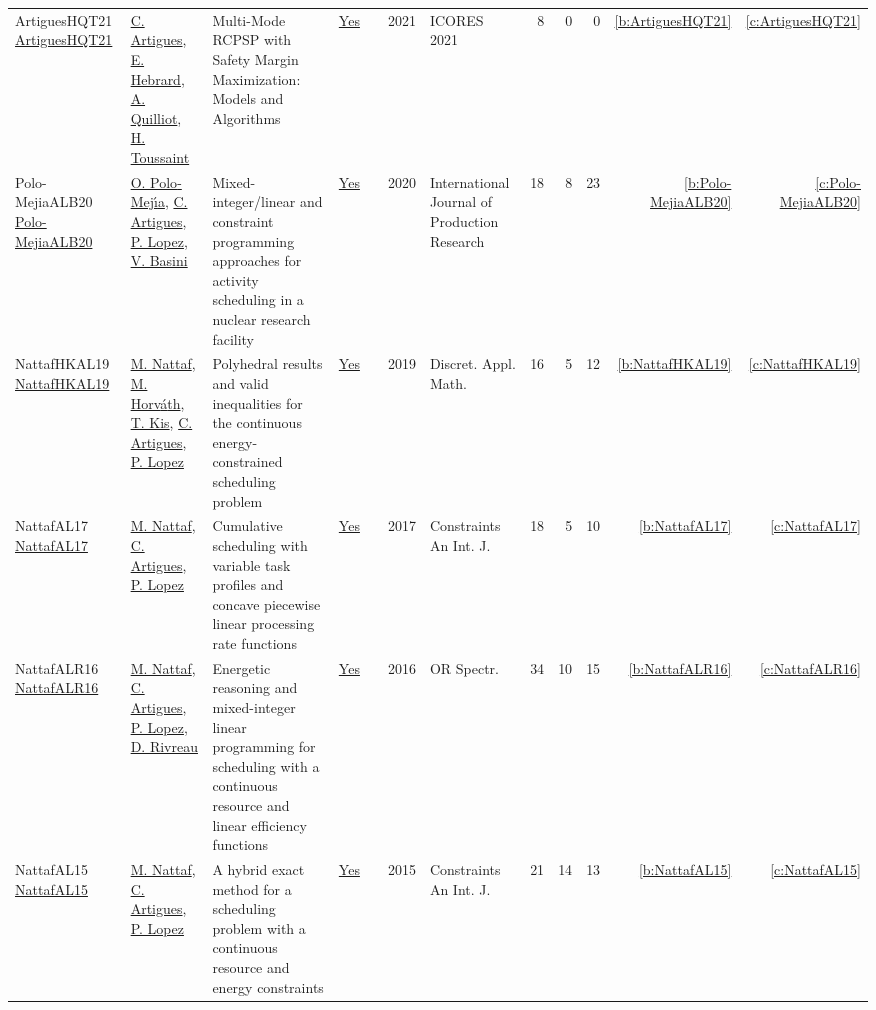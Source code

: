 {\begin{longtable}{>{\raggedright\arraybackslash}p{3cm}>{\raggedright\arraybackslash}p{6cm}>{\raggedright\arraybackslash}p{6.5cm}rrrp{2.5cm}rrrrr}
ArtiguesHQT21 \href{https://doi.org/10.5220/0010190101290136}{ArtiguesHQT21} & \hyperref[auth:a6]{C. Artigues}, \hyperref[auth:a1]{E. Hebrard}, \hyperref[auth:a801]{A. Quilliot}, \hyperref[auth:a802]{H. Toussaint} & Multi-Mode {RCPSP} with Safety Margin Maximization: Models and Algorithms & \href{works/ArtiguesHQT21.pdf}{Yes} & \cite{ArtiguesHQT21} & 2021 & ICORES 2021 & 8 & 0 & 0 & \ref{b:ArtiguesHQT21} & \ref{c:ArtiguesHQT21}\\
Polo-MejiaALB20 \href{https://doi.org/10.1080/00207543.2019.1693654}{Polo-MejiaALB20} & \hyperref[auth:a524]{O. Polo{-}Mej{\'{\i}}a}, \hyperref[auth:a6]{C. Artigues}, \hyperref[auth:a3]{P. Lopez}, \hyperref[auth:a525]{V. Basini} & Mixed-integer/linear and constraint programming approaches for activity scheduling in a nuclear research facility & \href{works/Polo-MejiaALB20.pdf}{Yes} & \cite{Polo-MejiaALB20} & 2020 & International Journal of Production Research & 18 & 8 & 23 & \ref{b:Polo-MejiaALB20} & \ref{c:Polo-MejiaALB20}\\
NattafHKAL19 \href{https://doi.org/10.1016/j.dam.2018.11.008}{NattafHKAL19} & \hyperref[auth:a81]{M. Nattaf}, \hyperref[auth:a1023]{M. Horv{\'{a}}th}, \hyperref[auth:a157]{T. Kis}, \hyperref[auth:a6]{C. Artigues}, \hyperref[auth:a3]{P. Lopez} & Polyhedral results and valid inequalities for the continuous energy-constrained scheduling problem & \href{works/NattafHKAL19.pdf}{Yes} & \cite{NattafHKAL19} & 2019 & Discret. Appl. Math. & 16 & 5 & 12 & \ref{b:NattafHKAL19} & \ref{c:NattafHKAL19}\\
NattafAL17 \href{https://doi.org/10.1007/s10601-017-9271-4}{NattafAL17} & \hyperref[auth:a81]{M. Nattaf}, \hyperref[auth:a6]{C. Artigues}, \hyperref[auth:a3]{P. Lopez} & Cumulative scheduling with variable task profiles and concave piecewise linear processing rate functions & \href{works/NattafAL17.pdf}{Yes} & \cite{NattafAL17} & 2017 & Constraints An Int. J. & 18 & 5 & 10 & \ref{b:NattafAL17} & \ref{c:NattafAL17}\\
NattafALR16 \href{https://doi.org/10.1007/s00291-015-0423-x}{NattafALR16} & \hyperref[auth:a81]{M. Nattaf}, \hyperref[auth:a6]{C. Artigues}, \hyperref[auth:a3]{P. Lopez}, \hyperref[auth:a1003]{D. Rivreau} & Energetic reasoning and mixed-integer linear programming for scheduling with a continuous resource and linear efficiency functions & \href{works/NattafALR16.pdf}{Yes} & \cite{NattafALR16} & 2016 & {OR} Spectr. & 34 & 10 & 15 & \ref{b:NattafALR16} & \ref{c:NattafALR16}\\
NattafAL15 \href{https://doi.org/10.1007/s10601-015-9192-z}{NattafAL15} & \hyperref[auth:a81]{M. Nattaf}, \hyperref[auth:a6]{C. Artigues}, \hyperref[auth:a3]{P. Lopez} & A hybrid exact method for a scheduling problem with a continuous resource and energy constraints & \href{works/NattafAL15.pdf}{Yes} & \cite{NattafAL15} & 2015 & Constraints An Int. J. & 21 & 14 & 13 & \ref{b:NattafAL15} & \ref{c:NattafAL15}\\

\end{longtable}}
